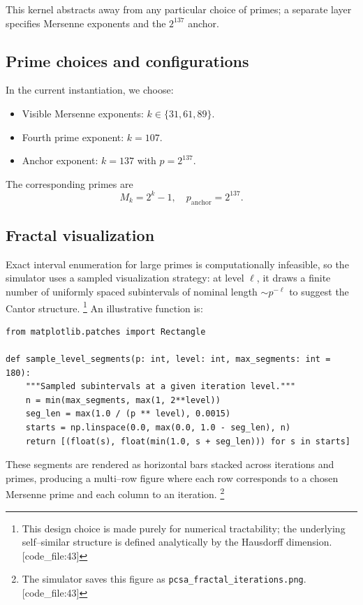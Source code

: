 \documentclass[11pt]{article}
\begin{document}
This kernel abstracts away from any particular choice of primes; a separate layer specifies Mersenne exponents and the $2^{137}$ anchor.

\subsection{Prime choices and configurations}

In the current instantiation, we choose:
\begin{itemize}
  \item Visible Mersenne exponents: $k \in \{31,61,89\}$.
  \item Fourth prime exponent: $k=107$.
  \item Anchor exponent: $k=137$ with $p = 2^{137}$.
\end{itemize}
The corresponding primes are
\[
  M_k = 2^k - 1,\quad p_\text{anchor} = 2^{137}.
\]

\subsection{Fractal visualization}

Exact interval enumeration for large primes is computationally infeasible, so the simulator uses a sampled visualization strategy: at level $\ell$, it draws a finite number of uniformly spaced subintervals of nominal length $\sim p^{-\ell}$ to suggest the Cantor structure.%
\footnote{This design choice is made purely for numerical tractability; the underlying self--similar structure is defined analytically by the Hausdorff dimension. [code\_file:43]} 
An illustrative function is:

\begin{verbatim}
from matplotlib.patches import Rectangle

def sample_level_segments(p: int, level: int, max_segments: int = 180):
    """Sampled subintervals at a given iteration level."""
    n = min(max_segments, max(1, 2**level))
    seg_len = max(1.0 / (p ** level), 0.0015)
    starts = np.linspace(0.0, max(0.0, 1.0 - seg_len), n)
    return [(float(s), float(min(1.0, s + seg_len))) for s in starts]
\end{verbatim}

These segments are rendered as horizontal bars stacked across iterations and primes, producing a multi--row figure where each row corresponds to a chosen Mersenne prime and each column to an iteration.%
\footnote{The simulator saves this figure as \texttt{pcsa\_fractal\_iterations.png}. [code\_file:43]} 
\end{document}
